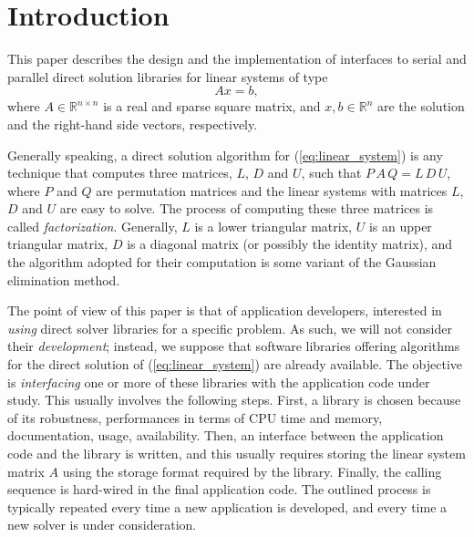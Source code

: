 \documentclass{llncs}
\begin{document}
\section{Introduction}
\label{sec:introduction}

This paper describes the design and the implementation of 
interfaces to serial and parallel direct solution libraries for
linear systems of type
\begin{equation}
  \label{eq:linear_system}
  A x = b,
\end{equation}
where $A \in \mathbb{R}^{n \times n}$ is a real and sparse square matrix, 
  and $x, b \in \mathbb{R}^{n}$ are the solution and
the right-hand side vectors, respectively. 

Generally speaking,
a direct solution algorithm for (\ref{eq:linear_system}) is any 
technique that computes three matrices, $L$, $D$ and $U$, such that
$P\, A\, Q = L \, D \, U$, where $P$ and $Q$ are permutation matrices
and the linear systems with matrices $L$, $D$ and $U$ are
easy to solve.
The process of computing these three matrices is called {\sl
  factorization}. Generally, $L$ is a lower triangular matrix, $U$ is an
upper triangular matrix, $D$ is a diagonal matrix 
(or possibly the identity matrix), and the algorithm adopted for their
computation is some variant of the Gaussian elimination method.

The point of view of this paper is that of application developers, interested
in {\sl using} direct solver libraries for a specific problem. As such, we
will not consider their {\sl development}; instead, we suppose that software
libraries offering algorithms for the direct solution of
(\ref{eq:linear_system}) are already available. The objective is {\sl
interfacing} one or more of these libraries with the application code under
study.  This usually involves the following steps. First, a library is chosen
because of its robustness, performances in terms of CPU time and memory,
documentation, usage, availability. Then, an interface between the application
code and the library is written, and this usually requires storing the linear
system matrix $A$ using the storage format required by the library. Finally, 
the calling sequence is hard-wired in the final application code.
The outlined process is typically repeated every time a new application is
developed, and every time a new solver is under consideration. 
\end{document}
